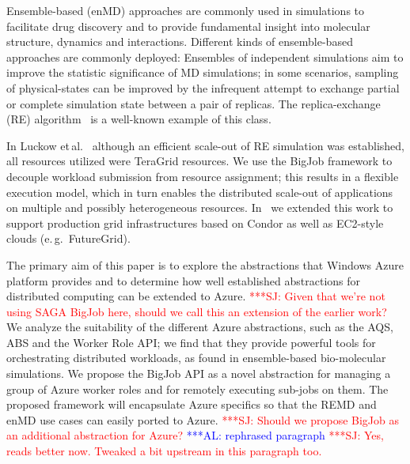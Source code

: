 \documentclass[conference,final]{IEEEtran}
\newcommand{\alnote}[1]{ {\textcolor{blue} { ***AL: #1 }}}
\newcommand{\jhanote}[1]{ {\textcolor{red} { ***SJ: #1 }}}
\newcommand{\alnote}[1]{}
\newcommand{\jhanote}[1]{}
\begin{document}
 



Ensemble-based (enMD) approaches are commonly used in simulations to
facilitate drug discovery and to provide fundamental insight into
molecular structure, dynamics and interactions.  Different kinds of
ensemble-based approaches are commonly deployed: Ensembles of
independent simulations aim to improve the statistic significance of
MD simulations; %
in some scenarios, sampling of physical-states can be improved by the
infrequent attempt to exchange partial or complete simulation state
between a pair of replicas. The replica-exchange (RE)
algorithm~\cite{hansmann} is a well-known example of this class. 

In Luckow et\,al.~\cite{repex_ptrs} although an efficient scale-out of RE
simulation was established, all resources utilized were TeraGrid
resources. We use the BigJob framework to decouple workload
submission from resource assignment; this results in a flexible
execution model, which in turn enables the distributed scale-out of
applications on multiple and possibly heterogeneous resources.
In~\cite{10.1109/CCGRID.2010.91} we extended this work to support
production grid infrastructures based on Condor as well as EC2-style
clouds (e.\,g.\ FutureGrid).
 
The primary aim of this paper is to explore the abstractions that
Windows Azure platform provides and to determine how well established
abstractions for distributed computing can be extended to Azure.
\jhanote{Given that we're not using SAGA BigJob here, should we call
  this an extension of the earlier work?}  We analyze the suitability
of the different Azure abstractions, such as
the AQS, ABS and the Worker Role API; we find that they provide
powerful tools for orchestrating distributed workloads, as found in
ensemble-based bio-molecular simulations.
We propose the BigJob API as a novel abstraction for managing a group
of Azure worker roles and for remotely executing sub-jobs on them. The
proposed framework will encapsulate Azure specifics so that the REMD
and enMD use cases can easily ported to Azure.  \jhanote{Should we
  propose BigJob as an additional abstraction for Azure?}
\alnote{rephrased paragraph}\jhanote{Yes, reads better now. Tweaked a
  bit upstream in this paragraph too.}
\end{document}
